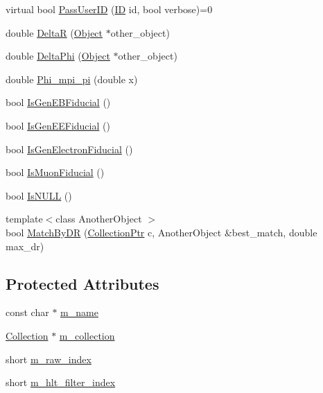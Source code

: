 \begin{DoxyCompactItemize}
\item 
virtual bool \hyperlink{class_object_ae28bc9879447dad23f10ebd1971e81f5}{Pass\+User\+I\+D} (\hyperlink{_i_d_types_8h_a094c367727273b4da2b960ca3b3edc06}{I\+D} id, bool verbose)=0
\item 
double \hyperlink{class_object_a5f825f0cdc0f45ec3efbea0bd1bc4c6a}{Delta\+R} (\hyperlink{class_object}{Object} $\ast$other\+\_\+object)
\item 
double \hyperlink{class_object_aaa50373e27e16bf086e0a2a24ae8a37b}{Delta\+Phi} (\hyperlink{class_object}{Object} $\ast$other\+\_\+object)
\item 
double \hyperlink{class_object_aaa45210cbaa92c8bb0e010c11a83c58c}{Phi\+\_\+mpi\+\_\+pi} (double x)
\item 
bool \hyperlink{class_object_a6b0f2caacff9cac58cae48f859546715}{Is\+Gen\+E\+B\+Fiducial} ()
\item 
bool \hyperlink{class_object_ac0980938e66610abc54ddbd4548410cf}{Is\+Gen\+E\+E\+Fiducial} ()
\item 
bool \hyperlink{class_object_ac29c9d8a48d0369ac06e921b578c0478}{Is\+Gen\+Electron\+Fiducial} ()
\item 
bool \hyperlink{class_object_a4f86f3820ed2571046d520047d2db7ae}{Is\+Muon\+Fiducial} ()
\item 
bool \hyperlink{class_object_afcf15ef137aabe615be23f6db585a779}{Is\+N\+U\+L\+L} ()
\item 
{\footnotesize template$<$class Another\+Object $>$ }\\bool \hyperlink{class_object_a1a01cc0958c3b491c26c2a066314481c}{Match\+By\+D\+R} (\hyperlink{_collection_8h_a64ea9217513944abee0afcb2ee82d787}{Collection\+Ptr} c, Another\+Object \&best\+\_\+match, double max\+\_\+dr)
\end{DoxyCompactItemize}
\subsection*{Protected Attributes}
\begin{DoxyCompactItemize}
\item 
const char $\ast$ \hyperlink{class_object_a90fd7f91e8f0f3eea7bc1eeed71ec3d6}{m\+\_\+name}
\item 
\hyperlink{class_collection}{Collection} $\ast$ \hyperlink{class_object_af66cc1db553fa91b451c7855a8d09ec0}{m\+\_\+collection}
\item 
short \hyperlink{class_object_a75e13245ae926f83a29ce9b25b8e4aa5}{m\+\_\+raw\+\_\+index}
\item 
short \hyperlink{class_object_ac1f71ac949f9d66cdeabca5dc7385a03}{m\+\_\+hlt\+\_\+filter\+\_\+index}
\end{DoxyCompactItemize}


